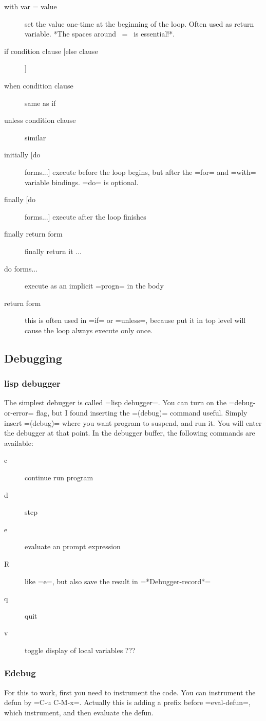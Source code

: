 \begin{description}
\item [with var = value] set the value one-time at the beginning of
  the loop.  Often used as return variable.  *The spaces around ~=~ is
  essential!*.
\item [if condition clause [else clause]]
\item [when condition clause] same as if
\item [unless condition clause] similar
\item [initially [do] forms...] execute before the loop begins, but
  after the =for= and =with= variable bindings. =do= is optional.
\item [finally [do] forms...] execute after the loop finishes
\item [finally return form] finally return it ...
\item [do forms...] execute as an implicit =progn= in the body
\item [return form] this is often used in =if= or =unless=, because
put it in top level will cause the loop always execute only once.
\end{description}



\subsection{Debugging}
\subsubsection{lisp debugger}
The simplest debugger is called =lisp debugger=.
You can turn on the =debug-or-error= flag,
but I found inserting the =(debug)= command useful.
Simply insert =(debug)= where you want program to suspend, and run it.
You will enter the debugger at that point.
In the debugger buffer, the following commands are available:
\begin{description}
\item [c] continue run program
\item [d] step
\item [e] evaluate an prompt expression
\item [R] like =e=, but also save the result in =*Debugger-record*=
\item [q] quit
\item [v] toggle display of local variables ???
\end{description}
\subsubsection{Edebug}
For this to work, first you need to instrument the code.
You can instrument the defun by =C-u C-M-x=.
Actually this is adding a prefix before =eval-defun=,
which instrument, and then evaluate the defun.

